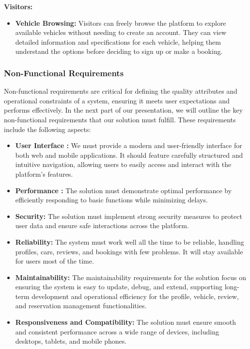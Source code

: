 \noindent\textbf{Visitors:}
\begin{itemize}
    \item \textbf{Vehicle Browsing:} Visitors can freely browse the platform to explore available vehicles without needing to create an account. They can view detailed information and specifications for each vehicle, helping them understand the options before deciding to sign up or make a booking. 
\end{itemize}

\newpage
\subsubsection{Non-Functional Requirements}
Non-functional requirements are critical for defining the quality attributes and operational constraints of a system, ensuring it meets user expectations and performs effectively. In the next part of our presentation, we will outline the key non-functional requirements that our solution must fulfill. These requirements include the following aspects:

\begin{itemize}

    
    \item \textbf{User Interface :} We must provide a modern and user-friendly interface for both web and mobile applications. It should feature carefully structured and intuitive navigation, allowing users to easily access and interact with the platform's features.
    \item \textbf{Performance :} The solution must demonstrate optimal performance by efficiently responding to basic functions while minimizing delays.
    
    \item \textbf{Security:} The solution must implement strong security measures to protect user data and ensure safe interactions across the platform.
    \item \textbf{Reliability:} The system must work well all the time to be reliable, handling profiles, cars, reviews, and bookings with few problems. It will stay available for users most of the time.
    \item \textbf{Maintainability:} The maintainability requirements for the solution focus on ensuring the system is easy to update, debug, and extend, supporting long-term development and operational efficiency for the profile, vehicle, review, and reservation management functionalities.
    \item \textbf{Responsiveness and Compatibility:} The solution must ensure smooth and consistent performance across a wide range of devices, including desktops, tablets, and mobile phones.
\end{itemize}
\newpage
